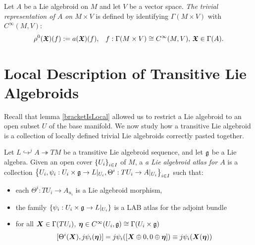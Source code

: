 \begin{definition}
Let $A$ be a Lie algebroid on $M$ and let $V$ be a vector space. \emph{The trivial representation of $A$ on $M \times V$} is defined by identifying $\Gamma(M \times V)$ with $C^\infty(M, V)$:
\begin{align*}
    \rho^0(\bm{\mathfrak{X}})(f) := a(\bm{\mathfrak{X}})(f), && f: \Gamma(M \times V) \cong C^\infty(M, V),\, \bm{\mathfrak{X}} \in \Gamma(A).
\end{align*}
\end{definition}

\section{Local Description of Transitive Lie Algebroids}

Recall that lemma \ref{bracketIsLocal} allowed us to restrict a Lie algebroid to an open subset $U$ of the base manifold. We now study how a transitive Lie algebroid is a collection of locally defined trivial Lie algebroids correctly pasted together.

\begin{definition}
Let $L \hookrightarrow^j A \twoheadrightarrow TM$ be a transitive Lie algebroid sequence, and let $\mathfrak{g}$ be a Lie algebra. Given an open cover $\left\{ U_i \right\}_{i \in I}$ of $M$, a \emph{a Lie algebroid atlas for $A$} is a collection $\left\{ U_i, \psi_i:U_i \times \mathfrak{g} \to L|_{U_i}, \Theta^i: TU_i \to A|_{U_i} \right\}_{i \in I}$ such that:
    \begin{itemize}
    
    \item each $\Theta^i: TU_i \to A_{u_i}$ is a Lie algebroid morphism,
    
    \item the family $\left\{ \psi_i:U_i \times \mathfrak{g} \to L|_{U_i} \right\}$ is a LAB atlas for the adjoint bundle 
    
    \item for all $\bm{X} \in \Gamma(TU_i)$, $\bm{\eta} \in C^\infty(U_i, \mathfrak{g}) \cong \Gamma(U_i \times \mathfrak{g})$
        \begin{align} \label{eqnCompLocal}
            [\Theta^i(\bm{X}), j\psi_i(\bm{\eta})] = j\psi_i([\bm{X} \oplus 0, 0 \oplus \bm{\eta}]) \equiv j\psi_i(\bm{X}(\bm{\eta})) 
        \end{align}
    
    \end{itemize}
\end{definition}

